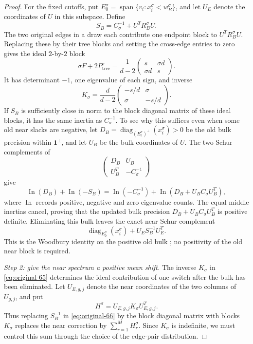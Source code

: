 \begin{proof}
For the fixed cutoffs, put
$E_0^\sigma=\operatorname{span}\{v_i:x_i^\sigma<w_B^\sigma\}$, and let
$U_E$ denote the coordinates of $U$ in this subspace.  Define
\begin{equation}
 S_B=C_\sigma^{-1}+U^TR_B^\sigma U.
 \label{eq:original-64}
\end{equation}
The two original edges in a draw each contribute one endpoint block to
$U^TR_B^\sigma U$.  Replacing these by their tree blocks and setting the
cross-edge entries to zero gives the ideal $2$-by-$2$ block
\[
 \sigma F+2P_{\mathrm{tree}}^\sigma
 =\frac1{d-2}
   \begin{pmatrix}s&\sigma d\\ \sigma d&s\end{pmatrix}.
\]
It has determinant $-1$, one eigenvalue of each sign, and inverse
\begin{equation}
 K_\sigma=
 \frac{d}{d-2}\begin{pmatrix}-s/d&\sigma\\ \sigma&-s/d\end{pmatrix}.
 \label{eq:original-65}
\end{equation}
If $S_B$ is sufficiently close in norm to the block diagonal matrix of these
ideal blocks, it has the same inertia as $C_\sigma^{-1}$.
To see why this suffices even when some old near slacks are negative, let
$D_B=\operatorname{diag}_{(E_0^\sigma)^\perp}(x_i^\sigma)>0$ be the
old bulk precision within $\mathbf1^\perp$, and let $U_B$ be the bulk
coordinates of $U$.  The two Schur complements of
\[
 \begin{pmatrix}D_B&U_B\\ U_B^T&-C_\sigma^{-1}\end{pmatrix}
\]
give
\[
 \operatorname{In}(D_B)+\operatorname{In}(-S_B)
 =\operatorname{In}(-C_\sigma^{-1})
   +\operatorname{In}(D_B+U_BC_\sigma U_B^T),
\]
where $\operatorname{In}$ records positive, negative and zero eigenvalue
counts.  The equal middle inertias cancel, proving that the updated bulk
precision $D_B+U_BC_\sigma U_B^T$ is positive definite.
Eliminating this bulk leaves the exact near Schur complement
\begin{equation}
 \operatorname{diag}_{E_0^\sigma}(x_i^\sigma)
       +U_ES_B^{-1}U_E^T.
 \label{eq:original-66}
\end{equation}
This is the Woodbury identity on the positive old bulk
\cite{HS1981}; no positivity of the old near block is required.

\par\smallskip\noindent\textit{Step 2: give the near spectrum a positive mean shift.}\quad
The inverse $K_\sigma$ in \eqref{eq:original-65} determines the ideal
contribution of one switch after the bulk has been eliminated.  Let
$U_{E,g,j}$ denote the near coordinates of the two columns of $U_{g,j}$,
and put
\[
 H^\sigma=U_{E,g,j}K_\sigma U_{E,g,j}^T.
\]
Thus replacing $S_B^{-1}$ in \eqref{eq:original-66} by the block diagonal
matrix with blocks $K_\sigma$ replaces the near correction by
$\sum_{r=1}^M H_r^\sigma$.  Since $K_\sigma$ is indefinite, we must control
this sum through the choice of the edge-pair distribution.


\end{proof}
